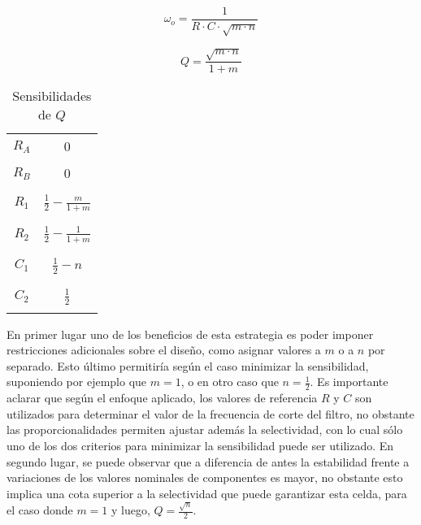 \begin{equation}
    \omega_o = \frac{1}{R \cdot C \cdot \sqrt{m \cdot n}}
    \label{eq:wo_ajuste_componentes_propocionales}
\end{equation}

\begin{equation}
    Q = \frac{\sqrt{m \cdot n}}{1 + m}
    \label{eq:q_ajuste_componentes_proporcionales}
\end{equation}

\begin{table}[H]
    \centering
    \begin{tabular}{c | c}
        \hline \\
        $R_A$ & $0$ \\
        \\ \hline \\
        $R_B$ & $0$ \\ 
        \\ \hline \\
        $R_1$ & $\frac{1}{2} - \frac{m}{1 + m}$ \\
        \\ \hline \\
        $R_2$ & $\frac{1}{2} - \frac{1}{1 + m}$ \\
        \\ \hline \\
        $C_1$ & $\frac{1}{2} - n$ \\
        \\ \hline \\
        $C_2$ & $\frac{1}{2}$ \\
        \\ \hline
    \end{tabular}
    \caption{Sensibilidades de $Q$}
\end{table}

En primer lugar uno de los beneficios de esta estrategia es poder imponer restricciones adicionales sobre el dise\~no, como asignar valores a $m$ o a $n$ por separado. Esto \'ultimo permitir\'ia seg\'un
el caso minimizar la sensibilidad, suponiendo por ejemplo que $m = 1$, o en otro caso que $n = \frac{1}{2}$. Es importante aclarar que seg\'un el enfoque aplicado, los valores de referencia $R$ y $C$ son utilizados
para determinar el valor de la frecuencia de corte del filtro, no obstante las proporcionalidades permiten ajustar adem\'as la selectividad, con lo cual s\'olo uno de los dos criterios para minimizar la sensibilidad puede ser utilizado.
En segundo lugar, se puede observar que a diferencia de antes la estabilidad frente a variaciones de los valores nominales de componentes es mayor, no obstante esto implica una cota superior a la selectividad que puede garantizar esta celda,
para el caso donde $m = 1$ y luego, $Q = \frac{\sqrt{n}}{2}$.

